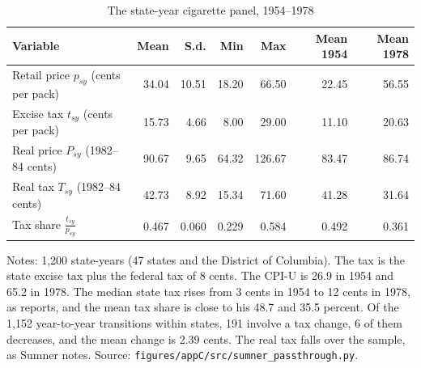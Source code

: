 \begin{table}[htbp]
\centering
\begin{threeparttable}
\caption{The state-year cigarette panel, 1954--1978}
\label{tab:C-panel-stats}
\small
\begin{tabular}{@{}lrrrrrr@{}}
\toprule
Variable & Mean & S.d. & Min & Max & Mean 1954 & Mean 1978 \\
\midrule
Retail price $p_{sy}$ (cents per pack) & 34.04 & 10.51 & 18.20 & 66.50 & 22.45 & 56.55 \\
Excise tax $t_{sy}$ (cents per pack) & 15.73 & 4.66 & 8.00 & 29.00 & 11.10 & 20.63 \\
Real price $P_{sy}$ (1982--84 cents) & 90.67 & 9.65 & 64.32 & 126.67 & 83.47 & 86.74 \\
Real tax $T_{sy}$ (1982--84 cents) & 42.73 & 8.92 & 15.34 & 71.60 & 41.28 & 31.64 \\
Tax share $\frac{t_{sy}}{p_{sy}}$ & 0.467 & 0.060 & 0.229 & 0.584 & 0.492 & 0.361 \\
\bottomrule
\end{tabular}
\begin{tablenotes}\footnotesize
\item Notes: 1,200 state-years (47 states and the District of Columbia). The tax is the state excise tax plus the
federal tax of 8 cents. The CPI-U is 26.9 in 1954 and 65.2 in 1978. The median state tax rises from 3 cents in 1954
to 12 cents in 1978, as \citet[n.~8]{Sumner1981} reports, and the mean tax share is close to his 48.7 and 35.5
percent. Of the 1,152 year-to-year transitions within states, 191 involve a tax change, 6 of them decreases, and the
mean change is 2.39 cents. The real tax falls over the sample, as Sumner notes. Source:
\texttt{figures/appC/src/sumner\_passthrough.py}.
\end{tablenotes}
\end{threeparttable}
\end{table}

